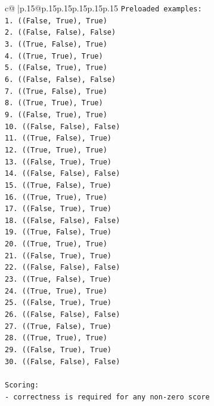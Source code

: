 \documentclass{article}
\begin{document}
{\begin{supertabular}{c@{$\;$}|p{.15\linewidth}@{}p{.15\linewidth}p{.15\linewidth}p{.15\linewidth}p{.15\linewidth}p{.15\linewidth}}
{{{\texttt{Preloaded examples:} \\
\texttt{1. ((False, True), True)} \\
\texttt{2. ((False, False), False)} \\
\texttt{3. ((True, False), True)} \\
\texttt{4. ((True, True), True)} \\
\texttt{5. ((False, True), True)} \\
\texttt{6. ((False, False), False)} \\
\texttt{7. ((True, False), True)} \\
\texttt{8. ((True, True), True)} \\
\texttt{9. ((False, True), True)} \\
\texttt{10. ((False, False), False)} \\
\texttt{11. ((True, False), True)} \\
\texttt{12. ((True, True), True)} \\
\texttt{13. ((False, True), True)} \\
\texttt{14. ((False, False), False)} \\
\texttt{15. ((True, False), True)} \\
\texttt{16. ((True, True), True)} \\
\texttt{17. ((False, True), True)} \\
\texttt{18. ((False, False), False)} \\
\texttt{19. ((True, False), True)} \\
\texttt{20. ((True, True), True)} \\
\texttt{21. ((False, True), True)} \\
\texttt{22. ((False, False), False)} \\
\texttt{23. ((True, False), True)} \\
\texttt{24. ((True, True), True)} \\
\texttt{25. ((False, True), True)} \\
\texttt{26. ((False, False), False)} \\
\texttt{27. ((True, False), True)} \\
\texttt{28. ((True, True), True)} \\
\texttt{29. ((False, True), True)} \\
\texttt{30. ((False, False), False)} \\
\\ 
\texttt{Scoring:} \\
\texttt{{-} correctness is required for any non{-}zero score} \\
}}}
\end{supertabular}}
\end{document}
